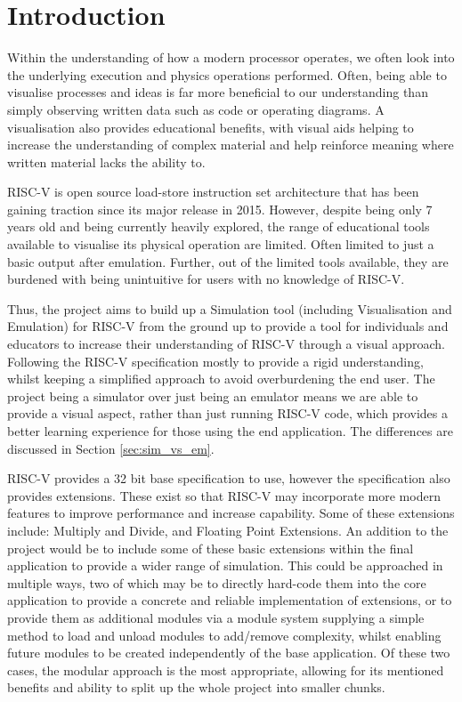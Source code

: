 \chapter{Introduction}
\label{ch:introduction}
Within the understanding of how a modern processor operates, we often look into the underlying execution and physics operations performed. Often, being able to visualise processes and ideas is far more beneficial \cite{quratulain_2019_a} to our understanding than simply observing written data such as code or operating diagrams. A visualisation also provides educational benefits, with visual aids helping to increase the understanding of complex material and help reinforce meaning where written material lacks the ability to.

RISC-V \cite{waterman_2019_the} is open source load-store instruction set architecture that has been gaining traction since its major release in 2015. However, despite being only 7 years old and being currently heavily explored, the range of educational tools available to visualise its physical operation are limited. Often limited to just a basic output after emulation. Further, out of the limited tools available, they are burdened with being unintuitive for users with no knowledge of RISC-V.

Thus, the project aims to build up a Simulation tool (including Visualisation and Emulation) for RISC-V from the ground up to provide a tool for individuals and educators to increase their understanding of RISC-V through a visual approach. Following the RISC-V specification \cite{waterman_2011_the} mostly to provide a rigid understanding, whilst keeping a simplified approach to avoid overburdening the end user. The project being a simulator over just being an emulator means we are able to provide a visual aspect, rather than just running RISC-V code, which provides a better learning experience for those using the end application. The differences are discussed in Section \ref{sec:sim_vs_em}.

RISC-V provides a 32 bit base specification to use, however the specification also provides extensions. These exist so that RISC-V may incorporate more modern features to improve performance and increase capability. Some of these extensions include: Multiply and Divide, and Floating Point Extensions. An addition to the project would be to include some of these basic extensions within the final application to provide a wider range of simulation. This could be approached in multiple ways, two of which may be to directly hard-code them into the core application to provide a concrete and reliable implementation of extensions, or to provide them as additional modules via a module system supplying a simple method to load and unload modules to add/remove complexity, whilst enabling future modules to be created independently of the base application. Of these two cases, the modular approach is the most appropriate, allowing for its mentioned benefits and ability to split up the whole project into smaller chunks.

